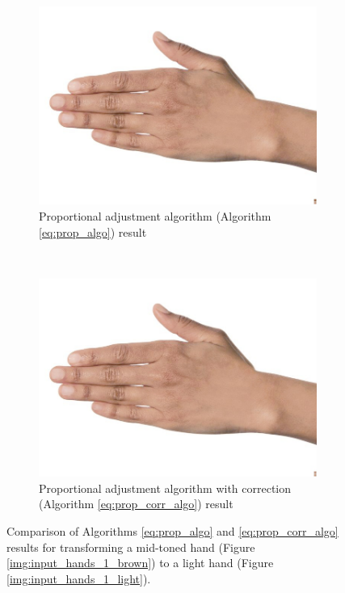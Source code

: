 \begin{figure}[H]
    \centering
    \begin{subfigure}[b]{0.40\textwidth}
        \includegraphics[width=\textwidth]{../rc_test/outputs/20170516_proportional_test/hand_brown_to_hand_light.jpg}
        \caption{Proportional adjustment algorithm (Algorithm \ref{eq:prop_algo}) result}
    \end{subfigure}
    ~
    \begin{subfigure}[b]{0.40\textwidth}
        \includegraphics[width=\textwidth]{../rc_test/outputs/20170522_proportional_corrected_test_alpha1p1/hand_brown_to_hand_light.jpg}
        \caption{Proportional adjustment algorithm with correction (Algorithm \ref{eq:prop_corr_algo}) result}
    \end{subfigure}
    \caption{Comparison of Algorithms \ref{eq:prop_algo} and \ref{eq:prop_corr_algo} results for transforming a mid-toned hand (Figure \ref{img:input_hands_1_brown}) to a light hand (Figure \ref{img:input_hands_1_light}).\label{img:compare_dark_spot}}
\end{figure}

